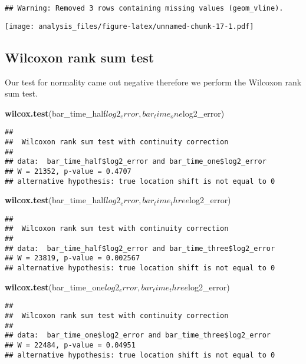 \documentclass[]{article}
\newenvironment{Shaded}{\begin{snugshade}}{\end{snugshade}}
\newcommand{\KeywordTok}[1]{\textcolor[rgb]{0.13,0.29,0.53}{\textbf{{#1}}}}
\newcommand{\NormalTok}[1]{{#1}}
\begin{document}
\begin{verbatim}
## Warning: Removed 3 rows containing missing values (geom_vline).
\end{verbatim}

\texttt{[image: analysis\_files/figure-latex/unnamed-chunk-17-1.pdf]}

\subsection{Wilcoxon rank sum test}\label{wilcoxon-rank-sum-test}

Our test for normality came out negative therefore we perform the
Wilcoxon rank sum test.

\begin{Shaded}
\begin{Highlighting}[]
\KeywordTok{wilcox.test}\NormalTok{(bar_time_half$log2_error, bar_time_one$log2_error)}
\end{Highlighting}
\end{Shaded}

\begin{verbatim}
## 
##  Wilcoxon rank sum test with continuity correction
## 
## data:  bar_time_half$log2_error and bar_time_one$log2_error
## W = 21352, p-value = 0.4707
## alternative hypothesis: true location shift is not equal to 0
\end{verbatim}

\begin{Shaded}
\begin{Highlighting}[]
\KeywordTok{wilcox.test}\NormalTok{(bar_time_half$log2_error, bar_time_three$log2_error)}
\end{Highlighting}
\end{Shaded}

\begin{verbatim}
## 
##  Wilcoxon rank sum test with continuity correction
## 
## data:  bar_time_half$log2_error and bar_time_three$log2_error
## W = 23819, p-value = 0.002567
## alternative hypothesis: true location shift is not equal to 0
\end{verbatim}

\begin{Shaded}
\begin{Highlighting}[]
\KeywordTok{wilcox.test}\NormalTok{(bar_time_one$log2_error, bar_time_three$log2_error)}
\end{Highlighting}
\end{Shaded}

\begin{verbatim}
## 
##  Wilcoxon rank sum test with continuity correction
## 
## data:  bar_time_one$log2_error and bar_time_three$log2_error
## W = 22484, p-value = 0.04951
## alternative hypothesis: true location shift is not equal to 0
\end{verbatim}
\end{document}
